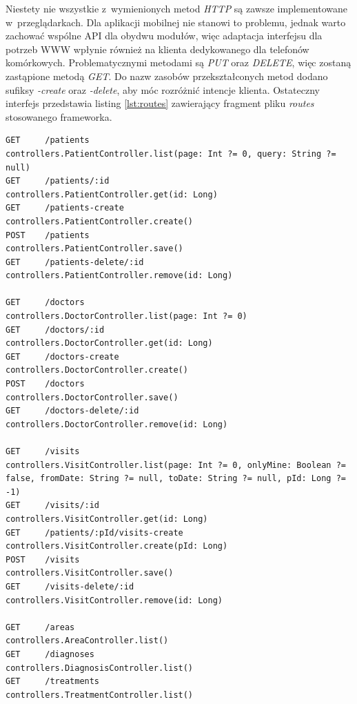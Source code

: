 \documentclass[11pt]{aghdpl}
\begin{document}
Niestety nie wszystkie z~wymienionych metod \emph{HTTP} są zawsze implementowane w~przeglądarkach. Dla aplikacji mobilnej nie stanowi to problemu, jednak warto zachować wspólne API dla obydwu modułów, więc adaptacja interfejsu dla potrzeb WWW wpłynie również na klienta dedykowanego dla telefonów komórkowych. Problematycznymi metodami są \emph{PUT} oraz \emph{DELETE}, więc zostaną zastąpione metodą \emph{GET}. Do nazw zasobów przekształconych metod dodano sufiksy \emph{-create} oraz \emph{-delete}, aby móc rozróżnić intencje klienta.
Ostateczny interfejs przedstawia listing \ref{lst:routes} zawierający fragment pliku \emph{routes} stosowanego frameworka.

\begin{lstlisting}[caption={Fragment pliku \emph{routes} zawierającego mapowanie wzorców URL interfejsu RESTful do wywoływanych metod kontrolerów w \emph{Play Framework}}, label={lst:routes}]
GET     /patients                                               controllers.PatientController.list(page: Int ?= 0, query: String ?= null)
GET     /patients/:id                                           controllers.PatientController.get(id: Long)
GET     /patients-create                                        controllers.PatientController.create()
POST    /patients                                                 controllers.PatientController.save()
GET     /patients-delete/:id                                     controllers.PatientController.remove(id: Long)

GET     /doctors                                                 controllers.DoctorController.list(page: Int ?= 0)
GET     /doctors/:id                                             controllers.DoctorController.get(id: Long)
GET     /doctors-create                                          controllers.DoctorController.create()
POST    /doctors                                                   controllers.DoctorController.save()
GET     /doctors-delete/:id                                      controllers.DoctorController.remove(id: Long)

GET     /visits                                                  controllers.VisitController.list(page: Int ?= 0, onlyMine: Boolean ?= false, fromDate: String ?= null, toDate: String ?= null, pId: Long ?= -1)
GET     /visits/:id                                              controllers.VisitController.get(id: Long)
GET     /patients/:pId/visits-create                             controllers.VisitController.create(pId: Long)
POST    /visits                                                  controllers.VisitController.save()
GET     /visits-delete/:id                                       controllers.VisitController.remove(id: Long)

GET     /areas                                                   controllers.AreaController.list()
GET     /diagnoses                                               controllers.DiagnosisController.list()
GET     /treatments                                              controllers.TreatmentController.list()
\end{lstlisting}
\end{document}
